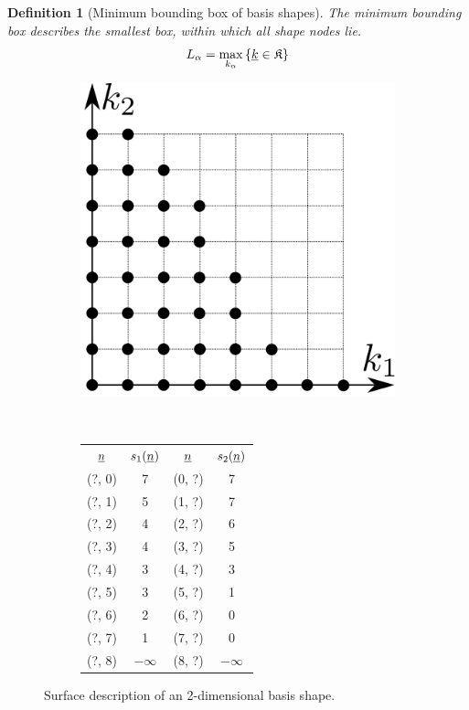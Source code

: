 \documentclass{article}
\newtheorem{definition}{Definition}
\begin{document}
\begin{definition}[Minimum bounding box of basis shapes]
  The minimum bounding box describes the smallest
  box, within which all shape nodes lie.
  \begin{equation}
    L_{\alpha}=\max_{k_{\alpha}}\left\{\underline{k} \in \mathfrak{K}\right\}
    \label{eq:basis_shape_bbox}
  \end{equation}
\end{definition}

\begin{figure}[H]
  \centering
  \begin{subfigure}[]{0.4\textwidth}
    \includegraphics[width=1.0\textwidth]{shape_example}
    \label{fig:shape_example}
  \end{subfigure}
  ~
  \begin{subfigure}[]{0.5\textwidth}
    \begin{tabular}{|| c | c || c | c ||}
      \(\underline{n}\) & \(s_1(\underline{n})\) & \(\underline{n}\) & \(s_2(\underline{n})\) \\
      (?, 0) & 7 & (0, ?) & 7 \\
      (?, 1) & 5 & (1, ?) & 7 \\
      (?, 2) & 4 & (2, ?) & 6 \\
      (?, 3) & 4 & (3, ?) & 5 \\
      (?, 4) & 3 & (4, ?) & 3 \\
      (?, 5) & 3 & (5, ?) & 1 \\
      (?, 6) & 2 & (6, ?) & 0 \\
      (?, 7) & 1 & (7, ?) & 0 \\
      (?, 8) & \(-\infty\) & (8, ?) & \(-\infty\) \\
    \end{tabular}
  \end{subfigure}
  \caption{Surface description of an 2-dimensional basis shape.}
\end{figure}
\end{document}
